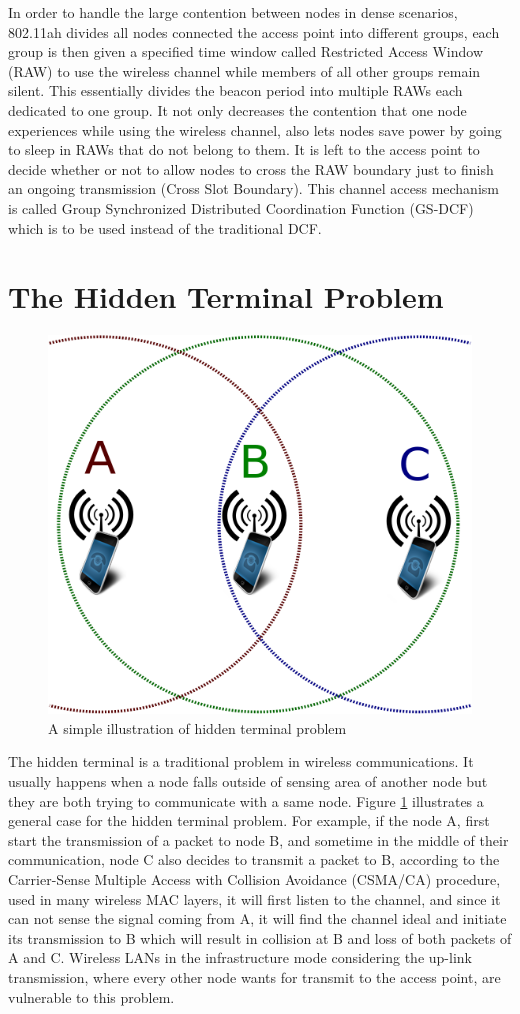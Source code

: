  In order to handle the large contention between nodes in dense scenarios, 802.11ah divides all nodes connected the access point into different groups, each group is then given a specified time window called Restricted Access Window (RAW) to use the wireless channel while members of all other groups remain silent. This essentially divides the beacon period into multiple RAWs each dedicated to one group. It not only decreases the contention that one node experiences while using the wireless channel, also lets nodes save power by going to sleep in RAWs that do not belong to them. It is left to the access point to decide whether or not to allow nodes to cross the RAW boundary just to finish an ongoing transmission (Cross Slot Boundary). This channel access mechanism is called Group Synchronized Distributed Coordination Function (GS-DCF) which is to be used instead of the traditional DCF.   

\section{The Hidden Terminal Problem}
\begin{figure}
  \centering
  \includegraphics[width=.65\textwidth]{figures/hidden}
  \caption{A simple illustration of hidden terminal problem}
  \label{fig:hidden}
\end{figure}

The hidden terminal is a traditional problem in wireless communications. It usually happens when a node falls outside of sensing area of another node but they are both trying to communicate with a same node. Figure \ref{fig:hidden} illustrates a general case for the hidden terminal problem. For example, if the node A, first start the transmission of a packet to node B, and sometime in the middle of their communication, node C also decides to transmit a packet to B, according to the Carrier-Sense Multiple Access with Collision Avoidance (CSMA/CA) procedure, used in many wireless MAC layers, it will first listen to the channel, and since it can not sense the signal coming from A, it will find the channel ideal and initiate its transmission to B which will result in collision at B and loss of both packets of A and C. Wireless LANs in the infrastructure mode considering the up-link transmission, where every other node wants for transmit to the access point, are vulnerable to this problem. 


